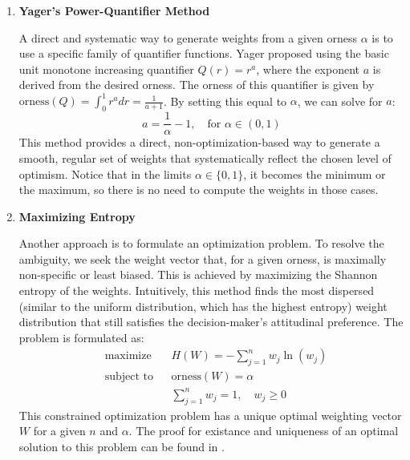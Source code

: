 \begin{enumerate}[label=(\roman*)]
    \item \textbf{Yager's Power-Quantifier Method}
    
    A direct and systematic way to generate weights from a given orness $\alpha$ is to use a specific family of quantifier functions. Yager proposed using the basic unit monotone increasing quantifier $Q(r) = r^a$, where the exponent $a$ is derived from the desired orness. The orness of this quantifier is given by $\text{orness}(Q) = \int_0^1 r^a dr = \frac{1}{a+1}$. By setting this equal to $\alpha$, we can solve for $a$:
    \begin{equation}
        a = \frac{1}{\alpha} - 1, \quad \text{for } \alpha \in (0, 1)
    \end{equation}
    This method provides a direct, non-optimization-based way to generate a smooth, regular set of weights that systematically reflect the chosen level of optimism. Notice that in the limits $\alpha \in \{0,1\}$, it becomes the minimum or the maximum, so there is no need to compute the weights in those cases.

    \item \textbf{Maximizing Entropy}
    
    Another approach is to formulate an optimization problem. To resolve the ambiguity, we seek the weight vector that, for a given orness, is maximally non-specific or least biased. This is achieved by maximizing the Shannon entropy of the weights. Intuitively, this method finds the most dispersed (similar to the uniform distribution, which has the highest entropy) weight distribution that still satisfies the decision-maker's attitudinal preference. The problem is formulated as:
    \begin{equation}
    \begin{aligned}
        & \text{maximize}   & & H(W) = -\sum_{j=1}^{n} w_j \ln(w_j) \\
        & \text{subject to} & & \text{orness}(W) = \alpha \\
        &                   & & \sum_{j=1}^{n} w_j = 1, \quad w_j \ge 0
    \end{aligned}
    \end{equation}
    This constrained optimization problem has a unique optimal weighting vector $W$ for a given $n$ and $\alpha$. The proof for existance and uniqueness of an optimal solution to this problem can be found in \cite[Sec.~2.3]{FULLER2}.
\end{enumerate}

